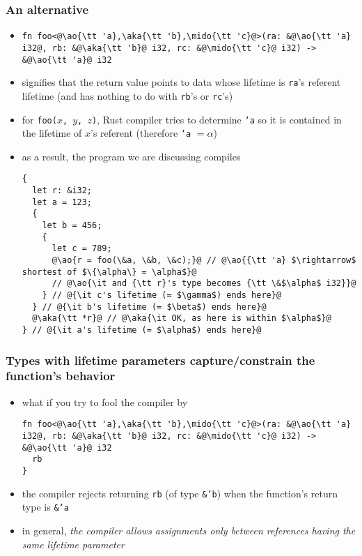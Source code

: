 \documentclass[12pt,dvipdfmx]{beamer}
\newcommand{\mido}[1]{{\color{green}#1}}
\newcommand{\ao}[1]{{\color{blue}#1}}
\newcommand{\aka}[1]{{\color{red}#1}}
\begin{document}
      
\begin{frame}[fragile]
  \frametitle{An alternative}
  \begin{itemize}
  \item
    \begin{lstlisting}
fn foo<@\ao{\tt 'a},\aka{\tt 'b},\mido{\tt 'c}@>(ra: &@\ao{\tt 'a} i32@, rb: &@\aka{\tt 'b}@ i32, rc: &@\mido{\tt 'c}@ i32) -> &@\ao{\tt 'a}@ i32
\end{lstlisting}
\item signifies that the return value points to data
  whose lifetime is {\tt ra}'s referent lifetime
  (and has nothing to do with {\tt rb}'s or {\tt rc}'s)
\item for {\tt foo($x$, $y$, $z$)},
  Rust compiler tries to determine {\tt 'a} so it is contained
  in the lifetime of $x$'s referent (therefore {\tt 'a} $= \alpha$)
\item as a result, the program we are discussing compiles
\begin{lstlisting}[basicstyle=\ttfamily\tiny]
{
  let r: &i32;
  let a = 123;
  {
    let b = 456;
    {
      let c = 789;
      @\ao{r = foo(\&a, \&b, \&c);}@ // @\ao{{\tt 'a} $\rightarrow$ shortest of $\{\alpha\} = \alpha$}@
      // @\ao{\it and {\tt r}'s type becomes {\tt \&$\alpha$ i32}}@
    } // @{\it c's lifetime (= $\gamma$) ends here}@
  } // @{\it b's lifetime (= $\beta$) ends here}@
  @\aka{\tt *r}@ // @\aka{\it OK, as here is within $\alpha$}@
} // @{\it a's lifetime (= $\alpha$) ends here}@
\end{lstlisting}
\end{itemize}
\end{frame}

\begin{frame}[fragile]
  \frametitle{Types with lifetime parameters capture/constrain the function's behavior}
  \begin{itemize}
  \item what if you try to fool the compiler by 
\begin{lstlisting}
fn foo<@\ao{\tt 'a},\aka{\tt 'b},\mido{\tt 'c}@>(ra: &@\ao{\tt 'a} i32@, rb: &@\aka{\tt 'b}@ i32, rc: &@\mido{\tt 'c}@ i32) -> &@\ao{\tt 'a}@ i32
  rb
}
\end{lstlisting}
\item the compiler rejects returning {\tt rb} (of type {\tt \&\aka{'b}})
  when the function's return type is {\tt \&\aka{'a}}
\item in general, \ao{\it the compiler allows assignments only between
  references having the same lifetime parameter}
  \end{itemize}
\end{frame}
\end{document}
